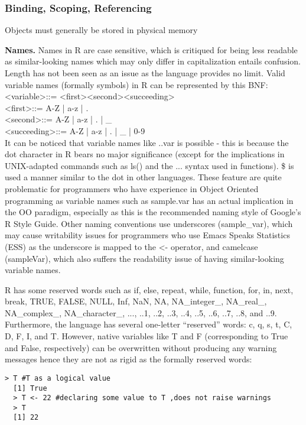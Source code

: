 \documentclass[12pt]{article}
\begin{document}
\subsubsection{Binding, Scoping, Referencing}

Objects must generally be stored in physical memory

\textbf{Names.} Names in R are case sensitive, which is critiqued for being less readable as similar-looking names which may only differ in capitalization entails confusion. Length has not been seen as an issue as the language provides no limit. Valid variable names (formally symbols) in R can be represented by this BNF: \\
\textless variable\textgreater ::= \textless first\textgreater \textless second\textgreater \textless succeeding\textgreater* \\
\textless first\textgreater ::= A-Z | a-z | . \\
\textless second\textgreater ::= A-Z | a-z | . | \_ \\
\textless succeeding\textgreater ::= A-Z | a-z | . | \_ | 0-9 \\

It can be noticed that variable names like ..var is possible - this is because the dot character in R bears no major significance (except for the implications in UNIX-adapted commands such as ls() and the ... syntax used in functions). \$ is used a manner similar to the dot in other languages. These feature are quite problematic for programmers who have experience in Object Oriented programming as variable names such as sample.var has an actual implication in the OO paradigm, especially as this is the recommended naming style of Google's R Style Guide. Other naming conventions use underscores (sample\_var), which may cause writability issues for programmers who use Emacs Speaks Statistics (ESS) as the underscore is mapped to the <- operator, and camelcase (sampleVar), which also suffers the readability issue of having similar-looking variable names.


R has some reserved words such as if, else, repeat, while, function, for, in, next, break, TRUE, FALSE, NULL, Inf, NaN, NA, NA\_integer\_, NA\_real\_, NA\_complex\_, NA\_character\_, ..., ..1, ..2, ..3, ..4, ..5, ..6, ..7, ..8, and ..9.
Furthermore, the language has several one-letter ``reserved'' words: c, q, s, t, C, D, F, I, and T. However, native variables like T and F (corresponding to True and False, respectively) can be overwritten without producing any warning messages hence they are not as rigid as the formally reserved words:
\begin{lstlisting}[frame=single]
  > T #T as a logical value
  [1] True
  > T <- 22 #declaring some value to T ,does not raise warnings
  > T
  [1] 22
\end{lstlisting}
\end{document}

